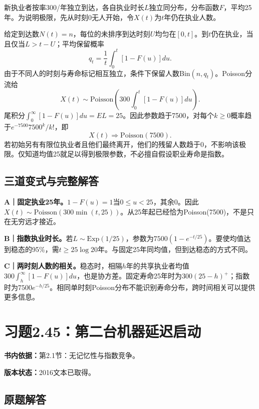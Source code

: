 \documentclass[
  11pt,
  a4paper,
  UTF8,fontset=fandol]{ctexart}
\let\OldSection\section
\renewcommand{\section}{\Needspace{7\baselineskip}\OldSection}
\let\OldSubsection\subsection
\renewcommand{\subsection}{\Needspace{5\baselineskip}\OldSubsection}
\begin{document}
新执业者按率300/年独立到达，各自执业时长\(L\)独立同分布，分布函数\(F\)，平均25年。为说明极限，先从时刻0无人开始，令\(X(t)\)为\(t\)年仍在执业人数。

给定到达数\(N(t)=n\)，每位的未排序到达时刻\(U\)均匀在\([0,t]\)。到\(t\)仍在执业，当且仅当\(L>t-U\)；平均保留概率
\[q_t=\frac1t\int_0^t[1-F(u)]du.\]
由于不同人的时刻与寿命标记相互独立，条件下保留人数Bin\((n,q_t)\)。Poisson分流给
\[X(t)\sim\mathrm{Poisson}\left(300\int_0^t[1-F(u)]du\right).\]
尾积分\(\int_0^\infty[1-F(u)]du=EL=25\)。因此参数趋于7500，对每个\(k\ge0\)概率趋于\(e^{-7500}7500^k/k!\)，即
\[\boxed{X(t)\Longrightarrow\mathrm{Poisson}(7500).}\]
若初始另有有限位执业者且他们最终离开，他们的残留人数趋于0，不影响该极限。仅知道均值25就足以得到极限参数，不必擅自假设职业寿命是指数。

\subsection{三道变式与完整解答}\label{ux4e09ux9053ux53d8ux5f0fux4e0eux5b8cux6574ux89e3ux7b54-43}

\textbf{A｜固定执业25年。}\(1-F(u)=1\)当\(0\le u<25\)，其余0。因此\(X(t)\sim\mathrm{Poisson}(300\min(t,25))\)。从25年起已经恰为Poisson(7500)，不是只在无穷远才接近。

\textbf{B｜指数执业时长。}若\(L\sim\mathrm{Exp}(1/25)\)，参数为\(7500(1-e^{-t/25})\)。要使均值达到稳态的95\%，需\(t\ge25\log20\)年。与固定25年同均值，但到达稳态的方式不同。

\textbf{C｜两时刻人数的相关。}稳态时，相隔\(h\)年的共享执业者均值\(300\int_h^\infty[1-F(u)]du\)，也是协方差。固定寿命25年时为\(300(25-h)^+\)；指数时为\(7500e^{-h/25}\)。相同单时刻Poisson分布不能识别寿命分布，跨时间相关可以提供更多信息。

\newpage

\section{习题2.45：第二台机器延迟启动}\label{ux4e60ux98982.45ux7b2cux4e8cux53f0ux673aux5668ux5ef6ux8fdfux542fux52a8}

\textbf{书内依据：}第2.1节：无记忆性与指数竞争。

\textbf{版本状态：}2016文本已取得。

\subsection{原题解答}\label{ux539fux9898ux89e3ux7b54-44}
\end{document}
